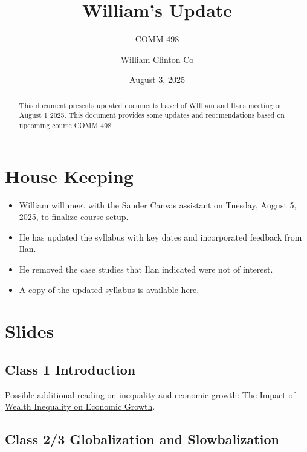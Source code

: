 \documentclass[
  11pt,
]{article}
\title{William's Update}
\subtitle{COMM 498}
\author{William Clinton Co}
\date{August 3, 2025}
\providecommand{\tightlist}{%
  \setlength{\itemsep}{0pt}\setlength{\parskip}{0pt}}
\renewcommand*\contentsname{Table of contents}
\newcommand\contentsname{Table of contents}
\begin{document}
\maketitle
\begin{abstract}
This document presents updated documents based of WIlliam and Ilans
meeting on August 1 2025. This document provides some updates and
reocmendations based on upcoming course COMM 498
\end{abstract}

\renewcommand*\contentsname{Table of contents}
{
\hypersetup{linkcolor=}
\setcounter{tocdepth}{3}
\tableofcontents
}

\section{House Keeping}\label{house-keeping}

\begin{itemize}
\tightlist
\item
  William will meet with the Sauder Canvas assistant on Tuesday, August
  5, 2025, to finalize course setup.
\item
  He has updated the syllabus with key dates and incorporated feedback
  from Ilan.
\item
  He removed the case studies that Ilan indicated were not of interest.
\item
  A copy of the updated syllabus is available
  \href{https://github.com/WilliamClintC/Comm_498/blob/main/Slides/William_Update_Syllabus.docx}{here}.
\end{itemize}

\section{Slides}\label{slides}

\subsection{Class 1 Introduction}\label{class-1-introduction}

Possible additional reading on inequality and economic growth:
\href{https://cepr.org/voxeu/columns/impact-wealth-inequality-economic-growth-evidence-italy-during-its-structural}{The
Impact of Wealth Inequality on Economic Growth}.

\subsection{Class 2/3 Globalization and
Slowbalization}\label{class-23-globalization-and-slowbalization}
\end{document}
